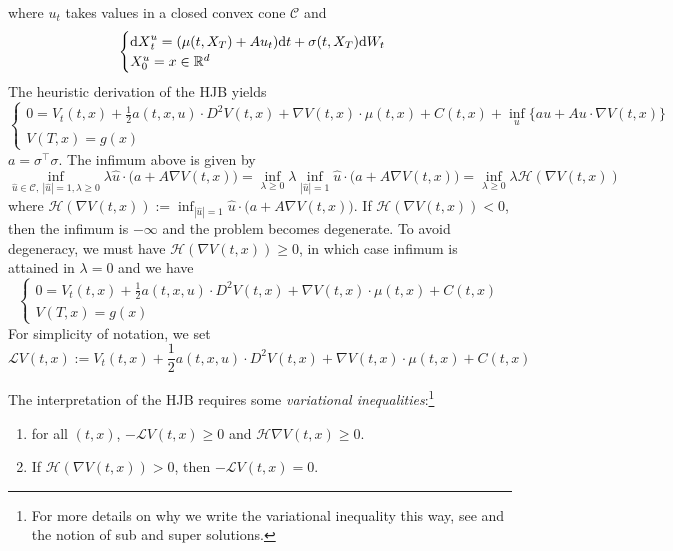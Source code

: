 \documentclass[11pt]{book}
\newcommand{\dt}{\text{\normalfont d}t}
\newcommand{\dX}{\text{\normalfont d}X}
\newcommand{\dW}{\text{\normalfont d}W}
\begin{document}
where $u_t$ takes values in a closed convex cone $\mathcal{C}$ and 
\begin{equation}
	\begin{cases}
	    {\dX}^u_t =(\mu(t,X_T)+Au_t){\dt}+\sigma(t,X_T)\dW_t\\
     X^u_0=x\in\mathbb{R}^d
	\end{cases}
\end{equation}
The heuristic derivation of the HJB yields
\begin{equation}
    \begin{cases}
        0={V}_{t}(t,x)+\frac12  a(t,x,u)\cdot D^2V(t,x) +\nabla V(t,x)\cdot \mu(t,x)+C(t,x)+\inf_{u}\Big\{au +
           Au\cdot \nabla V(t,x)\Big\}\\
         V(T,x)=g(x)
    \end{cases}
\end{equation}
$a=\sigma^\intercal\sigma$. The infimum above is given by 
\begin{equation}
    \inf_{\hat{u}\in\mathcal{C},~|\hat{u}|=1,\lambda\ge0}\lambda \hat{u}\cdot \big(a +
          A\nabla V(t,x)\big)=\inf_{\lambda\ge0}\lambda \inf_{|\hat{u}|=1}\hat{u}\cdot \big(a +
          A\nabla V(t,x)\big)=\inf_{\lambda\ge0}\lambda \mathcal{H}(\nabla V(t,x))
\end{equation}
where $\mathcal{H}(\nabla V(t,x)):=\inf_{|\hat{u}|=1}\hat{u}\cdot \big(a +
          A\nabla V(t,x)\big)$. If $\mathcal{H}(\nabla V(t,x))<0$, then the infimum is $-\infty$ and the problem becomes degenerate. To avoid degeneracy, we must have $\mathcal{H}(\nabla V(t,x))\ge0$, in which case infimum is attained in $\lambda=0$ and we have 
\begin{equation}
    \begin{cases}
        0={V}_{t}(t,x)+\frac12  a(t,x,u)\cdot D^2V(t,x) +\nabla V(t,x)\cdot \mu(t,x)+C(t,x)\\
         V(T,x)=g(x)
    \end{cases}
\end{equation}
For simplicity of notation, we set
\begin{equation}\label{eqn:mathcalL}
   \mathcal{L}V(t,x):={V}_{t}(t,x)+\frac12  a(t,x,u)\cdot D^2V(t,x) +\nabla V(t,x)\cdot \mu(t,x)+C(t,x)
\end{equation}          

The interpretation of the HJB requires some \textit{variational inequalities}:\footnote{For more details on why we write the variational inequality this way, see \cite[Chapter 11]{Fleming-Soner-book-06} and the  notion of sub and super solutions.}
\begin{enumerate}
    \item for all $(t,x)$, $-\mathcal{L}V(t,x)\ge0$ and $\mathcal{H}\nabla V(t,x)\ge0$.
    \item If $\mathcal{H}(\nabla V(t,x))>0$, then $-\mathcal{L}V(t,x)=0$.
\end{enumerate}
\end{document}
